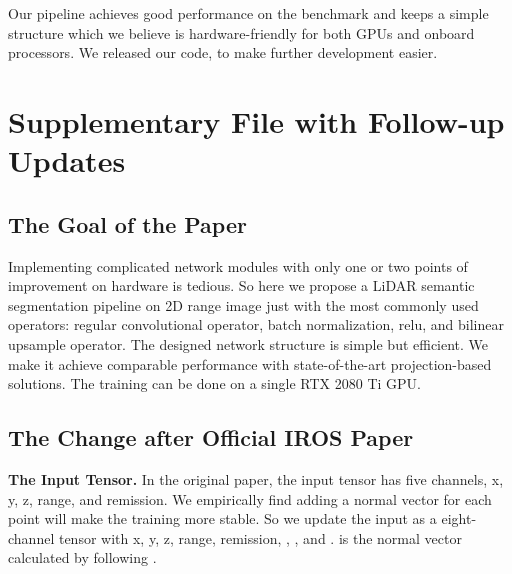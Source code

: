 \documentclass[letterpaper, 10 pt, conference]{ieeeconf}
\newcommand{\bfsection}[1]{\vspace*{0.1cm}\noindent\textbf{#1.}}
\begin{document}
Our pipeline achieves good performance on the benchmark and keeps a simple structure which we believe is hardware-friendly for both GPUs and onboard processors. We released our code, to make further development easier. 































\onecolumn
\section{Supplementary File with Follow-up Updates}


\subsection{The Goal of the Paper}

Implementing complicated network modules with only one or two points of improvement on hardware is tedious. So here we propose a LiDAR semantic segmentation pipeline on 2D range image just with the most commonly used operators: regular convolutional operator, batch normalization, relu, and bilinear upsample operator. The designed network structure is simple but efficient. We make it achieve comparable performance with state-of-the-art projection-based solutions. The training can be done on a single RTX 2080 Ti GPU.

\subsection{The Change after Official IROS Paper}
\bfsection{The Input Tensor} In the original paper, the input tensor has five channels, x, y, z, range, and remission. We empirically find adding a normal vector for each point will make the training more stable. So we update the input as a eight-channel tensor with x, y, z, range, remission, , , and .  is the normal vector calculated by following \cite{badino2011fast,zhao2021surface}.
\end{document}
